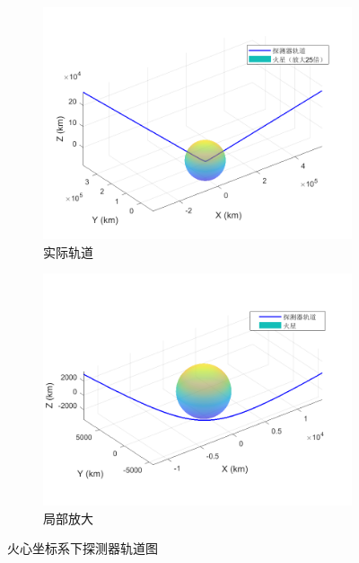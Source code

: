 \documentclass[12pt,a4paper]{article}
\begin{document}
\begin{figure}[H]
    \centering
    \begin{subfigure}{0.45\textwidth}
        \includegraphics[width=\textwidth]{images/mars_orbit.png}
        \caption{实际轨道}
    \end{subfigure}
    \begin{subfigure}{0.45\textwidth}
        \includegraphics[width=\textwidth]{images/mars_orbit_zoom.png}
        \caption{局部放大}
    \end{subfigure}
    \caption{火心坐标系下探测器轨道图}
\end{figure}


\end{document}
